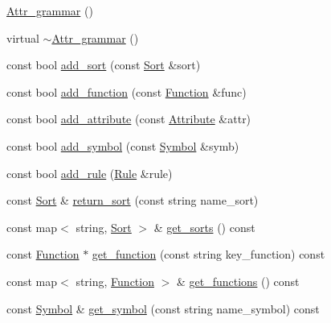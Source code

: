 \begin{CompactItemize}
\item 
\hyperlink{classgenevalmag_1_1Attr__grammar_4163922d72d60143cd36008ab7f7abce}{Attr\_\-grammar} ()
\item 
virtual \hyperlink{classgenevalmag_1_1Attr__grammar_4655bdc8253f4d480fd68441363a3cd0}{$\sim$Attr\_\-grammar} ()
\item 
const bool \hyperlink{classgenevalmag_1_1Attr__grammar_aa4b67f68b6cdcf70ed5876b63343db7}{add\_\-sort} (const \hyperlink{classgenevalmag_1_1Sort}{Sort} \&sort)
\item 
const bool \hyperlink{classgenevalmag_1_1Attr__grammar_2dc3357532cdef0dd92eaf3f55ca2ec2}{add\_\-function} (const \hyperlink{classgenevalmag_1_1Function}{Function} \&func)
\item 
const bool \hyperlink{classgenevalmag_1_1Attr__grammar_4ccf3523a20ea3e646942af93a9df7e2}{add\_\-attribute} (const \hyperlink{classgenevalmag_1_1Attribute}{Attribute} \&attr)
\item 
const bool \hyperlink{classgenevalmag_1_1Attr__grammar_66644b6cede73b6dcbdc7b6b7ef8826d}{add\_\-symbol} (const \hyperlink{classgenevalmag_1_1Symbol}{Symbol} \&symb)
\item 
const bool \hyperlink{classgenevalmag_1_1Attr__grammar_ec81306d22cc26b9d7276b70d30d329b}{add\_\-rule} (\hyperlink{classgenevalmag_1_1Rule}{Rule} \&rule)
\item 
const \hyperlink{classgenevalmag_1_1Sort}{Sort} \& \hyperlink{classgenevalmag_1_1Attr__grammar_cfa0b0a6876e33a4f6ab19afd073edf8}{return\_\-sort} (const string name\_\-sort)
\item 
const map$<$ string, \hyperlink{classgenevalmag_1_1Sort}{Sort} $>$ \& \hyperlink{classgenevalmag_1_1Attr__grammar_9e56cac2670355a2d93e3cd20afc1c2d}{get\_\-sorts} () const 
\item 
const \hyperlink{classgenevalmag_1_1Function}{Function} $\ast$ \hyperlink{classgenevalmag_1_1Attr__grammar_e1070b6d532da48fb2d87c40c76cf341}{get\_\-function} (const string key\_\-function) const 
\item 
const map$<$ string, \hyperlink{classgenevalmag_1_1Function}{Function} $>$ \& \hyperlink{classgenevalmag_1_1Attr__grammar_e9743e35703d55c1d9594d7061340b9b}{get\_\-functions} () const 
\item 
const \hyperlink{classgenevalmag_1_1Symbol}{Symbol} \& \hyperlink{classgenevalmag_1_1Attr__grammar_09a1044b5f34ae5794d602716b743129}{get\_\-symbol} (const string name\_\-symbol) const 
\item 

\end{CompactItemize}
